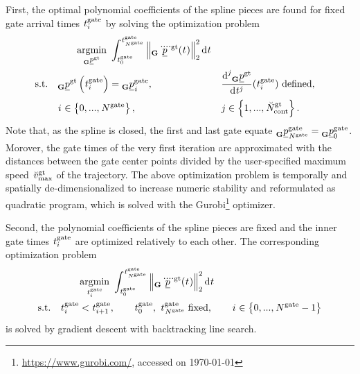 \begin{itemize}
    First,
    the optimal polynomial coefficients of the spline pieces
    are found for fixed gate arrival times 
    $\timepnt[]{\gate}{i}{}{}$
    by solving the optimization problem
    \begin{align} \label{eq:glo_traj_opt_prob}
        &\qquad \argmin{\pos[]{\glotraj}{}{\grs}{}}
        \int_{\timepnt[]{\gate}{0}{}{}}^{\timepnt[]{\gate}{\num[]{\gate}{}{}{}}{}{}}
            \left\|
                \pos[\ddddot]{\glotraj}{}{\grs}{}(\timepnt[]{}{}{}{})
            \right\|^2_2
        \text d \timepnt[]{}{}{}{}
        \nonumber 
        \\
        \text{s.t.}\quad
        & \pos[]{\glotraj}{}{\grs}{}\left(\timepnt[]{\gate}{i}{}{}\right) = 
            \pos[]{\gate}{\idx[]{}{}{}{}}{\grs}{},
        &&
            \frac{\text d^j \pos[]{\glotraj}{}{\grs}{}}{\text d \timepnt[]{j}{}{}{}} 
            (\timepnt[]{\gate}{i}{}{}) \text{ defined},
        \nonumber \\
        & \idx[]{}{}{}{} \in \left\{0, ..., \num[]{\gate}{}{}{}\right\},
        && j \in \left\{1, ..., \num[\user]{\glotraj}{\text{cont}}{}{}\right\}.
    \end{align}
    Note that, as the spline is closed, 
    the first and last gate equate 
    $\pos[]{\gate}{\num[]{\gate}{}{}{}}{\grs}{} = \pos[]{\gate}{0}{\grs}{}$.
    Morover, the gate times of the very first iteration are 
    approximated with the distances between the gate center points
    divided by the user-specified maximum speed $\speed[\user]{\glotraj}{\mxm}{}{}$ of the trajectory.
    The above optimization problem
    is temporally and spatially de-dimensionalized 
    to increase numeric stability and 
    reformulated as quadratic program,
    which is solved with the Gurobi\footnote{
        \url{https://www.gurobi.com/}, accessed on \today
    } optimizer.

    Second, the polynomial coefficients of the spline pieces 
    are fixed
    and the inner gate times
    $\timepnt[]{\gate}{i}{}{}$
    are optimized relatively to each other.
    The corresponding optimization problem
    \begin{align}
        &\qquad \argmin{\timepnt[]{\gate}{i}{}{}}
        \int_{\timepnt[]{\gate}{0}{}{}}^{\timepnt[]{\gate}{\num[]{\gate}{}{}{}}{}{}}
            \left\|
                \pos[\ddddot]{\glotraj}{}{\grs}{}(\timepnt[]{}{}{}{})
            \right\|^2_2
        \text d \timepnt[]{}{}{}{}
        \nonumber \\
        \text{s.t.}\quad
        & \timepnt[]{\gate}{i}{}{} < \timepnt[]{\gate}{i+1}{}{},
        \qquad
        \timepnt[]{\gate}{0}{}{},\ \timepnt[]{\gate}{\num[]{\gate}{}{}{}}{}{} \text{ fixed},
        \qquad
        \idx[]{}{}{}{} \in \left\{0, ..., \num[]{\gate}{}{}{} - 1 \right\}
    \end{align}
    is solved by gradient descent with backtracking line search.


\end{itemize}
